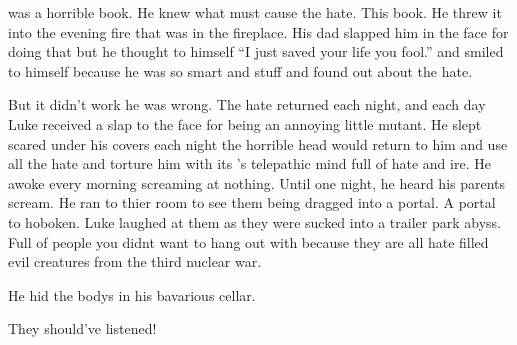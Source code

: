 was a horrible book. He knew what must cause the hate. This book.
He threw it into the evening fire that was in the fireplace. His
dad slapped him in the face for doing that but he thought to
himself ``I just saved your life you fool.'' and smiled to himself
because he was so smart and stuff and found out about the
hate.



But it didn't work he was wrong. The hate returned each night, and
each day Luke received a slap to the face for being an annoying
little mutant. He slept scared under his covers each night the
horrible head would return to him and use all the hate and torture
him with its 's telepathic mind full of hate and ire. He awoke
every morning screaming at nothing. Until one night, he heard his
parents scream. He ran to thier room to see them being dragged into
a portal. A portal to hoboken. Luke laughed at them as they were
sucked into a trailer park abyss. Full of people you didnt want to
hang out with because they are all hate filled evil creatures from
the third nuclear war.



He hid the bodys in his bavarious cellar.



They should've listened! 
 



